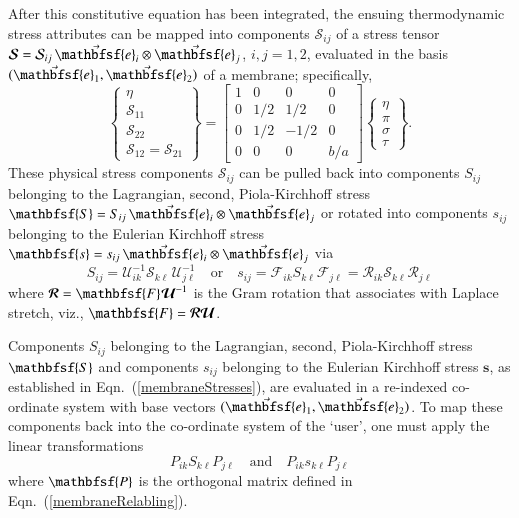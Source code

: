 After this constitutive equation has been integrated, the ensuing thermo\-dynamic stress attributes can be mapped into components $\mathcal{S}_{ij}$ of a stress tensor $\boldsymbol{\mathcal{S}} = \mathcal{S}_{ij} \, \vec{\mathbfsf{e}}_i \otimes \vec{\mathbfsf{e}}_j$, $i, j = 1, 2$, evaluated in the basis $( \vec{\mathbfsf{e}}_1 , \vec{\mathbfsf{e}}_2 )$ of a membrane; specifically,
\begin{equation}
   \left\{ \begin{matrix}
   \eta \\ \mathcal{S}_{11} \\ \mathcal{S}_{22} \\ \mathcal{S}_{12} = \mathcal{S}_{21}
   \end{matrix} \right\} = \begin{bmatrix}
   1 & 0 & 0 & 0 \\
   0 & 1/2 & 1/2 & 0 \\
   0 & 1/2 & -1/2 & 0 \\
   0 & 0 & 0 & b / a
   \end{bmatrix}
   \left\{ \begin{matrix}
   \eta \\ \pi \\ \sigma \\ \tau
   \end{matrix} \right\} .
\end{equation}
These physical stress components $\mathcal{S}_{ij}$ can be pulled back into components $S_{ij}$ belonging to the Lagrangian, second, Piola-Kirchhoff stress $\mathbfsf{S} = S_{ij} \, \vec{\mathbfsf{e}}_i \otimes \vec{\mathbfsf{e}}_j$ or rotated into components $s_{ij}$ belonging to the Eulerian Kirchhoff stress $\mathbfsf{s} = s_{ij} \, \vec{\mathbfsf{e}}_i \otimes \vec{\mathbfsf{e}}_j$ via 
\begin{equation}
    S_{ij} = \mathcal{U}^{-1}_{ik} \mathcal{S}_{k\ell\,} \mathcal{U}^{-1}_{j\ell}
    \quad \text{or} \quad
    s_{ij} = \mathcal{F}_{ik} S_{k\ell} \mathcal{F}_{j\ell} = 
    \mathcal{R}_{ik} \mathcal{S}_{k\ell} \mathcal{R}_{j\ell}
    \label{membraneStresses}
\end{equation}
where $\boldsymbol{\mathcal{R}} = \mathbfsf{F} \hspace{0.5pt} \boldsymbol{\mathcal{U}}^{-1}$ is the Gram rotation that associates with Laplace stretch, viz., $\mathbfsf{F} = \boldsymbol{\mathcal{RU}}$. 

Components $S_{ij}$ belonging to the Lagrangian, second, Piola-Kirchhoff stress $\mathbfsf{S}$ and components $s_{ij}$ belonging to the Eulerian Kirchhoff stress $\boldsymbol{s}$, as established in Eqn.~(\ref{membraneStresses}), are evaluated in a re-indexed co-ordinate system with base vectors $( \vec{\mathbfsf{e}}_1 , \vec{\mathbfsf{e}}_2 )$.  To map these components back into the co-ordinate system of the `user', one must apply the linear transformations
\begin{displaymath}
    P_{ik} S_{k\ell} P_{j\ell}
    \quad \text{and} \quad
    P_{ik} s_{k\ell} P_{j\ell} 
\end{displaymath}
where $\mathbfsf{P}$ is the orthogonal matrix defined in Eqn.~(\ref{membraneRelabling}).

